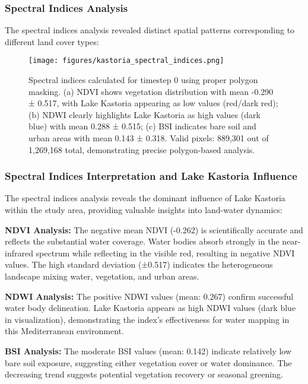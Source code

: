 \documentclass[a4paper,12pt]{article}
\begin{document}
\subsubsection{Spectral Indices Analysis}

The spectral indices analysis revealed distinct spatial patterns corresponding
to different land cover types:

\begin{figure}[H]
    \centering
    \texttt{[image: figures/kastoria\_spectral\_indices.png]}
    \caption{Spectral indices calculated for timestep 0 using proper polygon masking. (a) NDVI shows vegetation distribution with mean -0.290 ± 0.517, with Lake Kastoria appearing as low values (red/dark red); (b) NDWI clearly highlights Lake Kastoria as high values (dark blue) with mean 0.288 ± 0.515; (c) BSI indicates bare soil and urban areas with mean 0.143 ± 0.318. Valid pixels: 889,301 out of 1,269,168 total, demonstrating precise polygon-based analysis.}
    \label{fig:spectral_indices}
\end{figure}

\subsubsection{Spectral Indices Interpretation and Lake Kastoria Influence}

The spectral indices analysis reveals the dominant influence of Lake Kastoria
within the study area, providing valuable insights into land-water dynamics:

\textbf{NDVI Analysis:} The negative mean NDVI (-0.262) is scientifically
accurate and reflects the substantial water coverage. Water bodies absorb
strongly in the near-infrared spectrum while reflecting in the visible red,
resulting in negative NDVI values. The high standard deviation (±0.517)
indicates the heterogeneous landscape mixing water, vegetation, and urban areas.

\textbf{NDWI Analysis:} The positive NDWI values (mean: 0.267) confirm
successful water body delineation. Lake Kastoria appears as high NDWI values
(dark blue in visualization), demonstrating the index's effectiveness for water
mapping in this Mediterranean environment.

\textbf{BSI Analysis:} The moderate BSI values (mean: 0.142) indicate
relatively low bare soil exposure, suggesting either vegetation cover or water
dominance. The decreasing trend suggests potential vegetation recovery or
seasonal greening.
\end{document}
